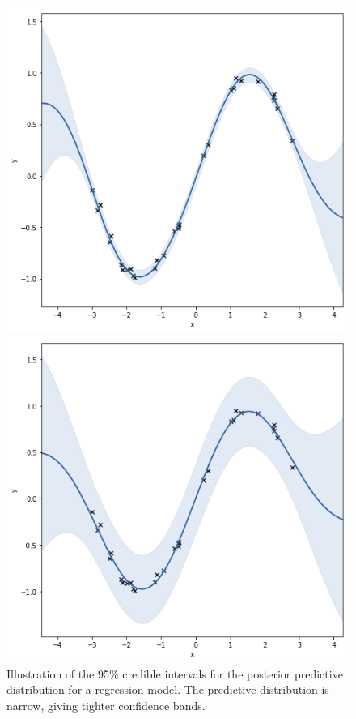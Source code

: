 \begin{figure}
  \begin{minipage}{.46\textwidth}
    \includegraphics[scale=0.48,width=\textwidth]{figures/high-confidence}
    \caption{Illustration of the 95\% credible intervals for the
    posterior predictive distribution for a regression model. The 
    predictive distribution is narrow, giving tighter
    confidence bands.}\label{fig:high-confidence}
  \end{minipage}
  \hspace{5pt}
  \begin{minipage}{.46\textwidth}
    \includegraphics[scale=0.5,width=\textwidth]{figures/low-confidence}

\end{minipage}
\end{figure}
